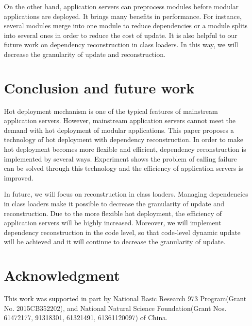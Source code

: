 \documentclass[conference]{IEEEtran}
\begin{document}
On the other hand, application servers can preprocess modules before modular applications are deployed.
It brings many benefits in performance. For instance, several modules merge into one module to reduce dependencies\cite{related_merge} or a module splits into several ones in order to reduce the cost of update\cite{related_split}.
It is also helpful to our future work on dependency reconstruction in class loaders.
In this way, we will decrease the granularity of update and reconstruction.


\section{Conclusion and future work\label{sec:conclusion}}
Hot deployment mechanism is one of the typical features of mainstream application servers.
However, mainstream application servers cannot meet the demand with hot deployment of modular applications.
This paper proposes a technology of hot deployment with dependency reconstruction.
In order to make hot deployment becomes more flexible and efficient, dependency reconstruction is implemented by several ways.
Experiment shows the problem of calling failure can be solved through this technology and the efficiency of application servers is improved.

In future, we will focus on reconstruction in class loaders.
Managing dependencies in class loaders make it possible to decrease the granularity of update and reconstruction.
Due to the more flexible hot deployment, the efficiency of application servers will be highly increased.
Moreover, we will implement dependency reconstruction in the code level\cite{future_Gu}, so that code-level dynamic update will be achieved and it will continue to decrease the granularity of update.


\section*{Acknowledgment}
This work was supported in part by National Basic Research 973 Program(Grant No. 2015CB352202), and National Natural Science Foundation(Grant Nos. 61472177, 91318301, 61321491, 61361120097) of China.

\end{document}
